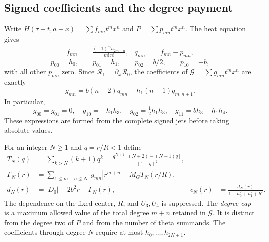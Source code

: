 \documentclass[11pt]{article}
\numberwithin{equation}{section}
\begin{document}
\subsection{Signed coefficients and the degree payment}

Write $H(\tau+t,a+x)=\sum f_{mn}t^mx^n$ and
$P=\sum p_{mn}t^mx^n$. The heat equation gives
\begin{align}
 f_{mn}&=\frac{(-1)^m h_{2m+n}}{m!\,n!},&
 q_{mn}&=f_{mn}-p_{mn},\label{fcg:heatcoefficients}
\end{align}
\[
 p_{00}=h_0,\qquad p_{01}=h_1,\qquad p_{02}=b/2,\qquad p_{10}=-b,
\]
with all other $p_{mn}$ zero. Since $\mathcal R_1=\partial_x\mathcal R_0$,
the coefficients of $\mathcal G=\sum g_{mn}t^mx^n$ are exactly
\begin{equation}\label{fcg:signedcoefficients}
 g_{mn}=b(n-2)q_{mn}+h_1(n+1)q_{m,n+1}.
\end{equation}
In particular,
\[
 g_{00}=g_{01}=0,\quad g_{10}=-h_1h_3,\quad
 g_{02}=\tfrac12h_1h_3,\quad g_{11}=bh_3-h_1h_4.
\]
These expressions are formed from the complete signed jets before
taking absolute values.

For an integer $N\ge1$ and $q=r/R<1$ define
\begin{align}
 T_N(q)&=\sum_{k>N}(k+1)q^k
       =\frac{q^{N+1}[(N+2)-(N+1)q]}{(1-q)^2},\label{fcg:taylortail}\\
 \Gamma_N(r)&=\sum_{1\le m+n\le N}|g_{mn}|r^{m+n}
                                      +M_GT_N(r/R),\label{fcg:gamma}\\
 d_N(r)&=|D_0|-2b^2r-\Gamma_N(r),&
 c_N(r)&=\frac{d_N(r)}{1+h_0^2+h_1^2+b^2}.\label{fcg:margin}
\end{align}
The dependence on the fixed center, $R$, and $U_3,U_4$ is suppressed.
The \emph{degree cap} is a maximum allowed value of the total degree
$m+n$ retained in $\mathcal G$. It is distinct from the degree two of $P$ and
from the number of theta summands. The coefficients through degree
$N$ require at most $h_0,\ldots,h_{2N+1}$.
\end{document}
